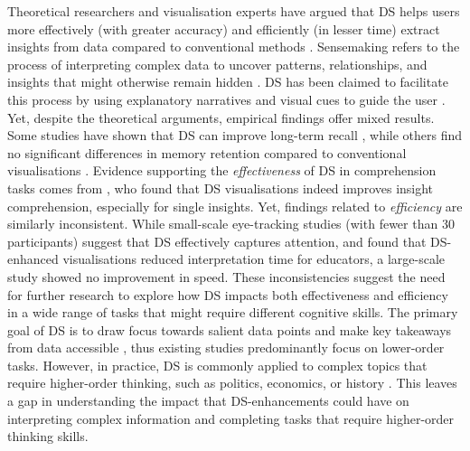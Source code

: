 Theoretical researchers and visualisation experts \cite{segel2010narrative, gershon2001, Daradkeh2021, boy2015storytelling, boy2017showing} have argued that DS helps users more effectively (with greater accuracy) and efficiently (in lesser time) extract insights from data compared to conventional methods \cite{elias2013storytelling, knaflic2015storytelling, zdanovic2022influence, segel2010narrative, gershon2001, krum2013cool, Hicks2009perceptual}. Sensemaking refers to the process of interpreting complex data to uncover patterns, relationships, and insights that might otherwise remain hidden \cite{campos2021makingsense}. DS has been claimed to facilitate this process by using explanatory narratives and visual cues to guide the user \cite{martinezmaldonado2020layeredstorytelling, srinivasan2019augmenting}. Yet, despite the theoretical arguments, empirical findings offer mixed results. Some studies have shown that DS can improve long-term recall \cite{bateman2010}, while others find no significant differences in memory retention compared to conventional visualisations \cite{zdanovic2022influence}. Evidence supporting the \textit{effectiveness} of DS in comprehension tasks comes from \citet{shao2024datastorytelling}, who found that DS visualisations indeed improves insight comprehension, especially for single insights. Yet, findings related to \textit{efficiency} are similarly inconsistent. While small-scale eye-tracking studies \cite{de2014evaluating, Pozdniakov2023how} (with fewer than 30 participants) suggest that DS effectively captures attention, and \citet{echeverria2018exploratory} found that DS-enhanced visualisations reduced interpretation time for educators, a large-scale study \cite{shao2024datastorytelling} showed no improvement in speed. These inconsistencies suggest the need for further research to explore how DS impacts both effectiveness and efficiency in a wide range of tasks that might require different cognitive skills. The primary goal of DS is to draw focus towards salient data points and make key takeaways from data accessible \cite{ryan2016visual}, thus existing studies predominantly focus on lower-order tasks. However, in practice, DS is commonly applied to complex topics that require higher-order thinking, such as politics, economics, or history \cite{seyser2018scrollytelling, morth2023scrollyvis}. This leaves a gap in understanding the impact that DS-enhancements could have on interpreting complex information and completing tasks that require higher-order thinking skills. 

